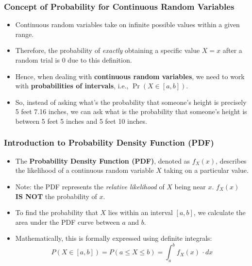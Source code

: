 \documentclass[handout]{beamer} %
\begin{document}
\begin{frame}
\frametitle{Concept of Probability for Continuous Random Variables}
    \begin{itemize}
        \item Continuous random variables take on infinite possible values within a given range. \pause
        \item Therefore, the probability of \emph{exactly} obtaining a specific value $X=x$ after a random trial is $0$ due to this definition. \pause
        \item Hence, when dealing with \textbf{continuous random variables}, we need to work with \textbf{probabilities of intervals}, i.e., $\Pr(X \in [a,b])$. \pause
        \item So, instead of asking what's the probability that someone's height is precisely 5 feet 7.16 inches, we can ask what is the probability that someone's height is between 5 feet 5 inches and 5 feet 10 inches.
    \end{itemize}
\end{frame}

\begin{frame}
\frametitle{Introduction to Probability Density Function (PDF)}
    \begin{itemize}
        \item The \textbf{Probability Density Function (PDF)}, denoted as $f_X(x)$, describes the likelihood of a continuous random variable $X$ taking on a particular value. \pause
        \item Note: the PDF represents the \emph{relative likelihood} of $X$ being near $x$. $f_X(x)$ \textbf{IS NOT} the probability of $x$.  \pause
        \item To find the probability that $X$ lies within an interval $[a, b]$, we calculate the area under the PDF curve between $a$ and $b$. \pause
        \item Mathematically, this is formally expressed using definite integrals:
        \[
        P(X\in [a,b]) = P(a \leq X \leq b) = \int_{a}^{b} f_X(x) \, \cdot dx
        \]
    \end{itemize}
\end{frame}
\end{document}
